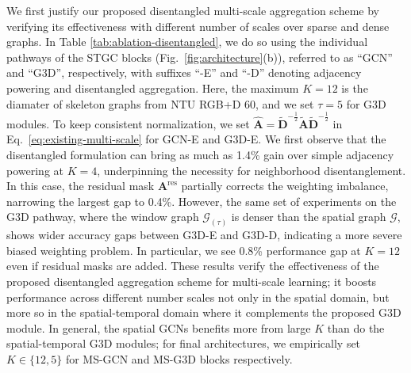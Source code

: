 \documentclass[10pt,twocolumn,letterpaper]{article}
\makeatletter
\renewcommand{\paragraph}{\@startsection{paragraph}{4}{\z@}{1.5ex \@plus 1ex \@minus .2ex}{-1em}{\normalfont\normalsize\bfseries}}
\makeatother
\begin{document}
We first justify our proposed disentangled multi-scale aggregation scheme by verifying its effectiveness with different number of scales over sparse and dense graphs. In Table \ref{tab:ablation-disentangled}, we do so using the individual pathways of the STGC blocks (Fig.~\ref{fig:architecture}(b)), referred to as ``GCN'' and ``G3D'', respectively, with suffixes ``-E'' and ``-D'' denoting adjacency powering and disentangled aggregation.
Here, the maximum $K=12$ is the diamater of skeleton graphs from NTU RGB+D 60, and we set $\tau=5$ for G3D modules.
To keep consistent normalization, we set $\widehat{\mathbf{A}} = \tilde{\mathbf{D}}^{-\frac{1}{2}} \tilde{\mathbf{A}} \tilde{\mathbf{D}}^{-\frac{1}{2}}$ in Eq.~\ref{eq:existing-multi-scale} for GCN-E and G3D-E.
We first observe that the disentangled formulation can bring as much as 1.4\% gain over simple adjacency powering at $K=4$, underpinning the necessity for neighborhood disentanglement.
In this case, the residual mask $\mathbf{A}^\text{res}$ partially corrects the weighting imbalance, narrowing the largest gap to 0.4\%.
However, the same set of experiments on the G3D pathway, where the window graph $\mathcal{G}_{(\tau)}$ is denser than the spatial graph $\mathcal{G}$, shows wider accuracy gaps between G3D-E and G3D-D, indicating a more severe biased weighting problem. In particular, we see 0.8\% performance gap at $K=12$ even if residual masks are added.
These results verify the effectiveness of the proposed disentangled aggregation scheme for multi-scale learning; it boosts performance across different number scales not only in the spatial domain, but more so in the spatial-temporal domain where it complements the proposed G3D module.
In general, the spatial GCNs benefits more from large $K$ than do the spatial-temporal G3D modules; for final architectures, we empirically set $K \in \{12,5\}$ for MS-GCN and MS-G3D blocks respectively.




\paragraph{Effectiveness of G3D.}
\end{document}
